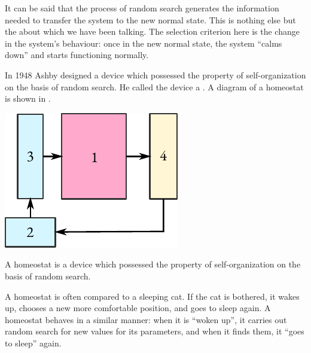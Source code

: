 It can be said that the process of random search generates the
information needed to transfer the system to the new normal state. This
is nothing else but the  about which we have been talking. The selection criterion here is the change in the
system's behaviour: once in the new normal state, the system ``calms
down'' and starts functioning normally.

In 1948 Ashby designed a device which possessed the property of
self-organization on the basis of random search. He called the device
a . A diagram of a homeostat is shown in .
\begin{marginfigure}%
 \centering
 \includegraphics[width=0.9\linewidth]{figures/homeostat.pdf}
\caption{A homeostat is a device which possessed the property of
self-organization on the basis of random search.\label{homeostat}}
 \end{marginfigure}
A homeostat is often compared to a sleeping cat. If the cat is bothered,
it wakes up, chooses a new more comfortable position, and goes to sleep
again. A homeostat behaves in a similar manner: when it is ``woken up'',
it carries out random search for new values for its parameters, and when
it finds them, it ``goes to sleep'' again.

